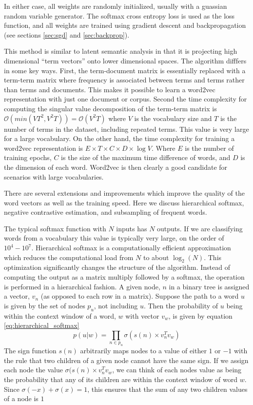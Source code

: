 In either case, all weights are randomly initialized, usually with a guassian random variable generator.  The softmax cross entropy loss is used as the loss function, and all weights are trained using gradient descent and backpropagation (see sections \ref{sec:sgd} and \ref{sec:backprop}).

This method is similar to latent semantic analysis in that it is projecting high dimensional ``term vectors'' onto lower dimensional spaces.  The algorithm difffers in some key ways.  First, the term-document matrix is essentially replaced with a term-term matrix where frequency is associated between terms and terms rather than terms and documents.  This makes it possible to learn a word2vec representation with just one document or corpus.  Second the time complexity for computing the singular value decomposition of the term-term matrix is $\mathcal{O}(min(VT^2,V^2T)) = \mathcal{O}(V^2T)$ where $V$ is the vocabulary size and $T$ is the number of terms in the dataset, including repeated terms.  This value is very large for a large vocabulary.  On the other hand, the time complexity for training a word2vec representation is $E\times T\times C\times D\times \log V$.  Where $E$ is the number of training epochs, $C$ is the size of the maximum time difference of words, and $D$ is the dimension of each word.  Word2vec is then clearly a good candidate for scenarios with large vocabularies.

There are several extensions and improvements which improve the quality of the word vectors as well as the training speed. \cite{tm13} Here we discuss hierarchical softmax, negative contrastive estimation, and subsampling of frequent words.

The typical softmax function with $N$ inputs has $N$ outputs.  If we are classifying words from a vocabulary this value is typically very large, on the order of $10^4 - 10^7$.  Hierarchical softmax is a computationally efficient approximation which reduces the computational load from $N$ to about $\log_2(N)$.  This optimization significantly changes the structure of the algorithm.  Instead of computing the output as a matrix multiply followed by a softmax, the operation is performed in a hierarchical fashion.  A given node, $n$ in a binary tree is assigned a vector, $v_n$ (as opposed to each row in a matrix).  Suppose the path to a word $u$ is given by the set of nodes $p_u$, not including $u$.  Then the probability of $u$ being within the context window of a word, $w$ with vector $v_w$, is given by equation \ref{eq:hierarchical_softmax}
\begin{equation}\label{eq:hierarchical_softmax}
p(u|w) = \prod_{n\in p_u} \sigma (s(n)\times v_n^Tv_w)
\end{equation}
The sign function $s(n)$ arbitrarily maps nodes to a value of either $1$ or $-1$ with the rule that two children of a given node cannot have the same sign.  If we assign each node the value $\sigma (s(n)\times v_n^Tv_w$, we can think of each nodes value as being the probability that any of its children are within the context window of word $w$.  Since $\sigma(-x) + \sigma(x) = 1$, this ensures that the sum of any two children values of a node is $1$
